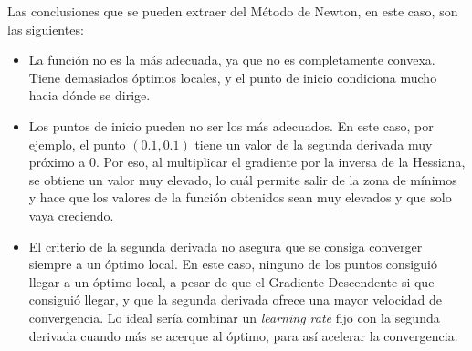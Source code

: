 \documentclass[11pt,a4paper]{article}
\begin{document}
Las conclusiones que se pueden extraer del Método de Newton, en este caso, son las siguientes:
 
\begin{itemize}[label=\textbullet]
	\item La función no es la más adecuada, ya que no es completamente convexa. Tiene demasiados óptimos locales, y el punto
	de inicio condiciona mucho hacia dónde se dirige.
	\item Los puntos de inicio pueden no ser los más adecuados. En este caso, por ejemplo, el punto $(0.1, 0.1)$ tiene un valor
	de la segunda derivada muy próximo a 0. Por eso, al multiplicar el gradiente por la inversa de la Hessiana, se obtiene un
	valor muy elevado, lo cuál permite salir de la zona de mínimos y hace que los valores de la función obtenidos sean muy
	elevados y que solo vaya creciendo.
	\item El criterio de la segunda derivada no asegura que se consiga converger siempre a un óptimo local. En este caso,
	ninguno de los puntos consiguió llegar a un óptimo local, a pesar de que el Gradiente Descendente si que consiguió llegar,
	y que la segunda derivada ofrece una mayor velocidad de convergencia. Lo ideal sería combinar un \textit{learning rate}
	fijo con la segunda derivada cuando más se acerque al óptimo, para así acelerar la convergencia.
\end{itemize}
\end{document}

